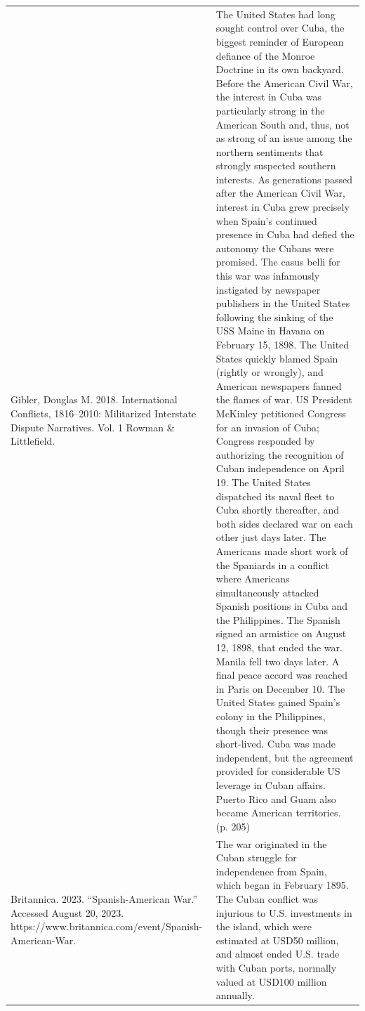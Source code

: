 {\begin{longtable}{p{}p{}}
Gibler, Douglas M. 2018. International Conflicts, 1816–2010: Militarized Interstate Dispute Narratives. Vol. 1 Rowman \& Littlefield. & The United States had long sought control over Cuba, the biggest reminder of European defiance of the Monroe Doctrine in its own backyard. Before the American Civil War, the interest in Cuba was particularly strong in the American South and, thus, not as strong of an issue among the northern sentiments that strongly suspected southern interests. As generations passed after the American Civil War, interest in Cuba grew precisely when Spain's continued presence in Cuba had defied the autonomy the Cubans were promised. The casus belli for this war was infamously instigated by newspaper publishers in the United States following the sinking of the USS Maine in Havana on February 15, 1898. The United States quickly blamed Spain (rightly or wrongly), and American newspapers fanned the flames of war. US President McKinley petitioned Congress for an invasion of Cuba; Congress responded by authorizing the recognition of Cuban independence on April 19. The United States dispatched its naval fleet to Cuba shortly thereafter, and both sides declared war on each other just days later. The Americans made short work of the Spaniards in a conflict where Americans simultaneously attacked Spanish positions in Cuba and the Philippines. The Spanish signed an armistice on August 12, 1898, that ended the war. Manila fell two days later. A final peace accord was reached in Paris on December 10. The United States gained Spain's colony in the Philippines, though their presence was short-lived. Cuba was made independent, but the agreement provided for considerable US leverage in Cuban affairs. Puerto Rico and Guam also became American territories. (p. 205)
\\
Britannica. 2023. “Spanish-American War.” Accessed August 20, 2023. https://www.britannica.com/event/Spanish-American-War. & The war originated in the Cuban struggle for independence from Spain, which began in February 1895. The Cuban conflict was injurious to U.S. investments in the island, which were estimated at USD50 million, and almost ended U.S. trade with Cuban ports, normally valued at USD100 million annually.
\\

\end{longtable}}
